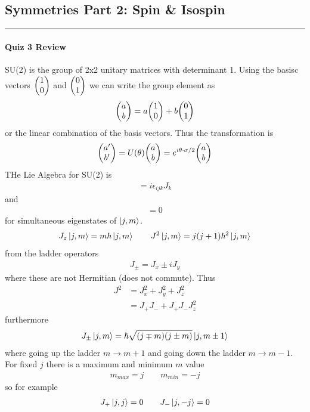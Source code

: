 \documentclass[../main.tex]{subfiles}
\begin{document}
\newpage
{}
\subsection*{Symmetries Part 2: Spin \& Isospin}
\hrule \vspace{10px}

\paragraph{Quiz 3 Review}
SU(2) is the group of 2x2 unitary matrices with determinant 1. Using the basisc vectors
$\mqty(1 \\ 0)$ and $\mqty(0 \\ 1)$ we can write the group element as
\begin{align*}
    \mqty(a \\ b) = a \mqty(1 \\ 0) + b \mqty(0 \\ 1)
\end{align*}
or the linear combination of the basis vectors. Thus the transformation is
\begin{align*}
    \mqty(a' \\ b') = U(\theta) \mqty(a \\ b) = e^{i\vb{\theta} \cdot \vb{\sigma} / 2} \mqty(a \\ b)
\end{align*}
THe Lie Algebra for SU(2) is
\begin{align*}
    [J_i, J_j] = i \epsilon_{ijk} J_k
\end{align*}
and
\begin{align*}
    [J^2, J_i] = 0
\end{align*}
for simultaneous eigenstates of $\ket{j,m}$.
\begin{align*}
    J_z \ket{j,m} = m\hbar \ket{j,m} \qquad
    J^2 \ket{j,m} = j(j+1)\hbar^2 \ket{j,m}
\end{align*}
from the ladder operators
\begin{align*}
    J_\pm = J_x \pm i J_y
\end{align*}
where these are not Hermitian (does not commute). Thus
\begin{align*}
    J^2 &= J_x^2 + J_y^2 + J_z^2 \\
    &= J_+ J_- + J_+ J_- J_z^2
\end{align*}
furthermore
\begin{align*}
    J_\pm \ket{j,m} = \hbar \sqrt{(j \mp m)(j \pm m)} \ket{j, m \pm 1}
\end{align*}
where going up the ladder $m \rightarrow m + 1$ and going down the ladder $m \rightarrow m - 1$.
For fixed $j$ there is a maximum and minimum $m$ value
\begin{align*}
    m_{max} = j \qquad m_{min} = -j
\end{align*}
so for example
\begin{align*}
    J_+ \ket{j,j} = 0 \qquad J_- \ket{j,-j} = 0
\end{align*}
\end{document}
